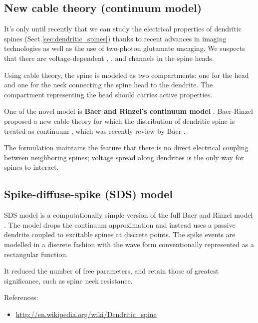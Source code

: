 \subsection{New cable theory (continuum model)}
\label{sec:new-cable-theory}
\label{sec:dendritic_spines_model}

It's only until recently that we can study the electrical properties of
dendritic spines (Sect.\ref{sec:dendritic_spines}) thanks to recent advances in
imaging technologies as well as the use of two-photon glutamate uncaging. We
suspects that there are voltage-dependent , , and 
channels in the spine heads.

Using cable theory, the spine is modeled as two compartments: one for
the head and one for the neck connecting the spine head to the
dendrite. The compartment representing the head should carries active
properties. 

One of the novel model is {\bf Baer and Rinzel's continuum model}
\citep{baer1991}.  
Baer-Rinzel proposed a new cable theory for which the distribution of
dendritic spine is treated as continuum \citep{baer1991}, which was recently
review by Baer \cite{baer2014}.

The formulation maintains the feature that there is no direct electrical
coupling between neighboring spines; voltage spread along dendrites is the only
way for spines to interact.

\subsection{Spike-diffuse-spike (SDS) model}
\label{sec:spike-diffuse-spike-model}

SDS model is a computationally simple version of the full Baer and Rinzel model
\citep{coombes2000}.
The model drops the continuum approximation and instead uses a passive dendrite
coupled to excitable spines at discrete points.
The spike events are modelled in a discrete fashion with the wave form
conventionally represented as a rectangular function.

It reduced the number of free parameters, and retain those of greatest
significance, such as spine neck resistance.
 

References:
\begin{itemize}
\item \url{http://en.wikipedia.org/wiki/Dendritic_spine}
\end{itemize}


